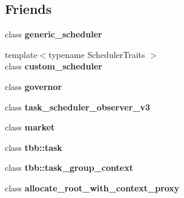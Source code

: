 \subsection*{Friends}
\begin{DoxyCompactItemize}
\item 
\hypertarget{classtbb_1_1internal_1_1arena_a9acd4f7b134e3bcd5625ce386ec7db60}{}class {\bfseries generic\+\_\+scheduler}\label{classtbb_1_1internal_1_1arena_a9acd4f7b134e3bcd5625ce386ec7db60}

\item 
\hypertarget{classtbb_1_1internal_1_1arena_a276a67d14225fdfbb225cc85299850e3}{}{\footnotesize template$<$typename Scheduler\+Traits $>$ }\\class {\bfseries custom\+\_\+scheduler}\label{classtbb_1_1internal_1_1arena_a276a67d14225fdfbb225cc85299850e3}

\item 
\hypertarget{classtbb_1_1internal_1_1arena_a208d153faaea0c8a58845b7f35a50618}{}class {\bfseries governor}\label{classtbb_1_1internal_1_1arena_a208d153faaea0c8a58845b7f35a50618}

\item 
\hypertarget{classtbb_1_1internal_1_1arena_a57561b6b580489c4476f14b9bc8d9e2f}{}class {\bfseries task\+\_\+scheduler\+\_\+observer\+\_\+v3}\label{classtbb_1_1internal_1_1arena_a57561b6b580489c4476f14b9bc8d9e2f}

\item 
\hypertarget{classtbb_1_1internal_1_1arena_ad285005b97c0c084157a6be5e6e0f2ee}{}class {\bfseries market}\label{classtbb_1_1internal_1_1arena_ad285005b97c0c084157a6be5e6e0f2ee}

\item 
\hypertarget{classtbb_1_1internal_1_1arena_aa6b778dc8acdcf631a87d9ae107a5338}{}class {\bfseries tbb\+::task}\label{classtbb_1_1internal_1_1arena_aa6b778dc8acdcf631a87d9ae107a5338}

\item 
\hypertarget{classtbb_1_1internal_1_1arena_ab99d537be159caba2e6a72eafc6cbdf4}{}class {\bfseries tbb\+::task\+\_\+group\+\_\+context}\label{classtbb_1_1internal_1_1arena_ab99d537be159caba2e6a72eafc6cbdf4}

\item 
\hypertarget{classtbb_1_1internal_1_1arena_a07522a6bc4c494cae54e2927fd3fdd99}{}class {\bfseries allocate\+\_\+root\+\_\+with\+\_\+context\+\_\+proxy}\label{classtbb_1_1internal_1_1arena_a07522a6bc4c494cae54e2927fd3fdd99}


\end{DoxyCompactItemize}
